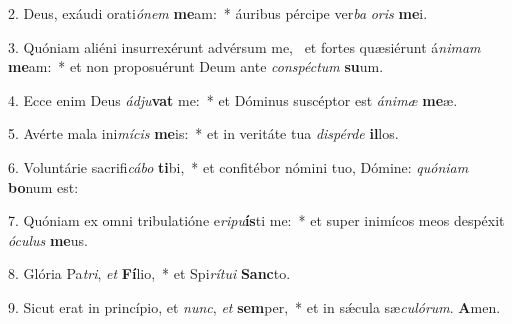 2. Deus, exáudi orati\textit{ó}\textit{nem} \textbf{me}am:~*  áuribus pércipe ver\textit{ba} \textit{o}\textit{ris} \textbf{me}i.\

3. Quóniam aliéni insurrexérunt advérsum me, \dag\  et fortes quæsiérunt á\textit{ni}\textit{mam} \textbf{me}am:~*  et non proposuérunt Deum ante \textit{con}\textit{spéc}\textit{tum} \textbf{su}um.\

4. Ecce enim Deus \textit{ád}\textit{ju}\textbf{vat} me:~*  et Dóminus suscéptor est \textit{á}\textit{ni}\textit{mæ} \textbf{me}æ.\

5. Avérte mala ini\textit{mí}\textit{cis} \textbf{me}is:~*  et in veritáte tua \textit{dis}\textit{pér}\textit{de} \textbf{il}los.\

6. Voluntárie sacrifi\textit{cá}\textit{bo} \textbf{ti}bi,~*  et confitébor nómini tuo, Dómine: \textit{quón}\textit{i}\textit{am} \textbf{bo}num est:\

7. Quóniam ex omni tribulatióne e\textit{ri}\textit{pu}\textbf{ís}ti me:~*  et super inimícos meos despéxit \textit{ó}\textit{cu}\textit{lus} \textbf{me}us.\

8. Glória Pa\textit{tri}, \textit{et} \textbf{Fí}lio,~*  et Spi\textit{rí}\textit{tu}\textit{i} \textbf{Sanc}to.\

9. Sicut erat in princípio, et \textit{nunc}, \textit{et} \textbf{sem}per,~*  et in sǽcula sæ\textit{cu}\textit{ló}\textit{rum}. \textbf{A}men.\

